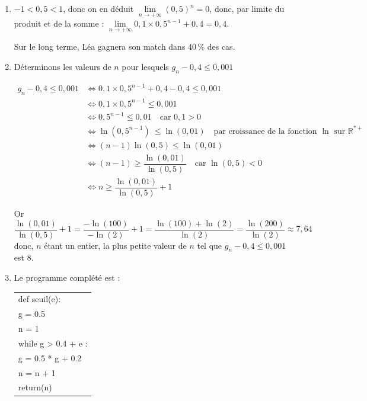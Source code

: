 \documentclass[10pt]{article}
\providecommand{\red}{\color{red}}
\providecommand{\R}{\mathbb{R}}
\providecommand{\red}{\color{red}}
\begin{document}
\begin{enumerate}
	or $0,5 > 0$ et $0,1> 0$ donc $g_{n+1}- g_{n}< 0 \iff g_{n+1} <  g_{n}$

	La suite $\left(g_n\right)$ est strictement décroissante.


	\item   $-1 < 0,5<1$, donc on en déduit $\lim\limits_{n \to +\infty} \left(0,5\right)^n = 0$, donc, par limite du produit et de la somme : $\lim\limits_{n \to +\infty} 0,1 \times 0,5^{n-1}+0,4 = 0,4$.

	Sur le long terme, Léa gagnera son match dans 40\,\% des cas.
	\item  Déterminons les valeurs de $n$ pour lesquels  $g_n-0,4\leqslant 0,001$

	$\begin{aligned} g_n-0,4\leqslant 0,001 & \iff 0,1 \times 0,5^{n-1}+0,4 -0,4 \leqslant 0,001 \\
	&\iff 0,1 \times 0,5^{n-1} \leqslant 0,001 \\
		&\iff 0,5^{n-1} \leqslant 0,01 \quad \text {car } 0,1>0\\
	&\iff \ln\left( 0,5^{n-1} \right)\ \leqslant \ln(0,01) \quad \text{par croissance de la fonction } \ln \text{ sur }\R^{*+}\\
	&\iff(n-1) \ln\left( 0,5 \right) \leqslant \ln(0,01) \\
	&\iff(n-1) \geqslant \dfrac{\ln(0,01)}{\ln(0,5)} \quad \text {car } \ln(0,5)<0\\
	&\iff n \geqslant \dfrac{\ln(0,01)}{\ln(0,5)} +1 	\end{aligned}$


	Or  $\dfrac{\ln(0,01)}{\ln(0,5)} +1 = \dfrac{-\ln(100)}{-\ln(2)} + 1 = \dfrac{\ln(100)+ \ln(2)}{\ln(2)} = \dfrac{\ln(200)}{\ln(2)} \approx 7,64$ donc, $n$ étant un entier, la plus petite valeur de $n$ tel que $g_n-0,4\leqslant 0,001$ est 8.

	\item Le programme complété est :

	\begin{center}
		\ttfamily
		\begin{tabularx}{10cm}{|X|}\hline
			def seuil(e):\\
			\quad g = 0.5\\
			\quad n = 1\\
			\quad while {g \red > 0.4 + e} :\\
			\quad \quad g =  0.5 * g + 0.2\\
			\quad \quad n = {\red n + 1}\\
			\quad return(n)\\ \hline
		\end{tabularx}
	\end{center}
\end{enumerate}
\end{document}
